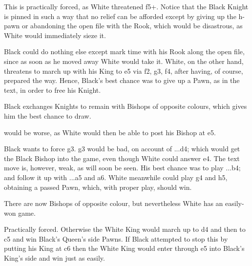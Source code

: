 \documentclass[10pt,twoside]{article}
\begin{document}

This is practically forced, as White threatened \figN f5+. Notice that the Black Knight is pinned in such a way that no relief can be afforded except by giving up the h-pawn or abandoning the open file with the Rook, which would be disastrous, as White would immediately sieze it.


\board


Black could do nothing else except mark time with his Rook along the open file, since as soon as he moved away White would take it. White, on the other hand, threatens to march up with his King to e5 via f2, g3, f4, after having, of course, prepared the way. Hence, Black's best chance was to give up a Pawn, as in the text, in order to free his Knight.


Black exchanges Knights to remain with Bishops of opposite colours, which gives him the best chance to draw.


 would be worse, as White would then be able to post his Bishop at e5.


\board

Black wants to force \figB g3. g3 would be bad, on account of ...d4; which would get the Black Bishop into the game, even though White could answer e4. The text move is, however, weak, as will soon be seen. His best chance was to play ...b4; and follow it up with ...a5 and \figB a6. White meanwhile could play g4 and h5, obtaining a passed Pawn, which, with proper play, should win.


There are now Bishops of opposite colour, but nevertheless White has an easily-won game.


\board


Practically forced. Otherwise the White King would march up to d4 and then to c5 and win Black's Queen's side Pawns. If Black attempted to stop this by putting his King at c6 then the White King would enter through e5 into Black's King's side and win just as easily.
\end{document}

